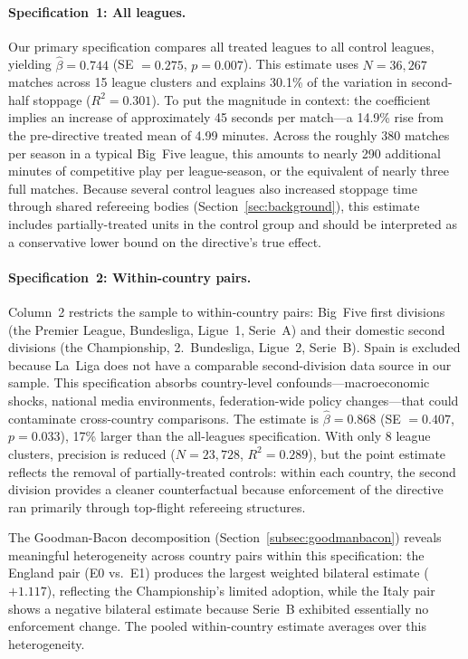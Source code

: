 \paragraph{Specification~1: All leagues.} Our primary specification compares all treated leagues to all control leagues, yielding $\hat{\beta} = 0.744$ (SE $= 0.275$, $p = 0.007$). This estimate uses $N = 36{,}267$ matches across 15 league clusters and explains 30.1\% of the variation in second-half stoppage ($R^2 = 0.301$). To put the magnitude in context: the coefficient implies an increase of approximately 45 seconds per match---a 14.9\% rise from the pre-directive treated mean of 4.99 minutes. Across the roughly 380 matches per season in a typical Big~Five league, this amounts to nearly 290 additional minutes of competitive play per league-season, or the equivalent of nearly three full matches. Because several control leagues also increased stoppage time through shared refereeing bodies (Section~\ref{sec:background}), this estimate includes partially-treated units in the control group and should be interpreted as a conservative lower bound on the directive's true effect.

\paragraph{Specification~2: Within-country pairs.} Column~2 restricts the sample to within-country pairs: Big~Five first divisions (the Premier League, Bundesliga, Ligue~1, Serie~A) and their domestic second divisions (the Championship, 2.~Bundesliga, Ligue~2, Serie~B). Spain is excluded because La~Liga does not have a comparable second-division data source in our sample. This specification absorbs country-level confounds---macroeconomic shocks, national media environments, federation-wide policy changes---that could contaminate cross-country comparisons. The estimate is $\hat{\beta} = 0.868$ (SE $= 0.407$, $p = 0.033$), 17\% larger than the all-leagues specification. With only 8 league clusters, precision is reduced ($N = 23{,}728$, $R^2 = 0.289$), but the point estimate reflects the removal of partially-treated controls: within each country, the second division provides a cleaner counterfactual because enforcement of the directive ran primarily through top-flight refereeing structures.

The Goodman-Bacon decomposition (Section~\ref{subsec:goodmanbacon}) reveals meaningful heterogeneity across country pairs within this specification: the England pair (E0 vs.\ E1) produces the largest weighted bilateral estimate ($+1.117$), reflecting the Championship's limited adoption, while the Italy pair shows a negative bilateral estimate because Serie~B exhibited essentially no enforcement change. The pooled within-country estimate averages over this heterogeneity.

